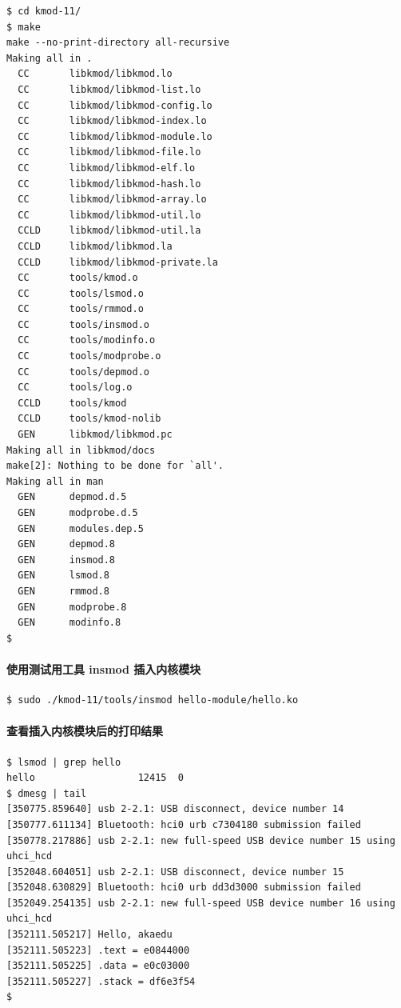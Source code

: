 \documentclass[11pt,a4paper]{article}
\begin{document}
{\begin{shaded}\begin{verbatim}
$ cd kmod-11/ 
$ make
make --no-print-directory all-recursive
Making all in .
  CC       libkmod/libkmod.lo
  CC       libkmod/libkmod-list.lo
  CC       libkmod/libkmod-config.lo
  CC       libkmod/libkmod-index.lo
  CC       libkmod/libkmod-module.lo
  CC       libkmod/libkmod-file.lo
  CC       libkmod/libkmod-elf.lo
  CC       libkmod/libkmod-hash.lo
  CC       libkmod/libkmod-array.lo
  CC       libkmod/libkmod-util.lo
  CCLD     libkmod/libkmod-util.la
  CCLD     libkmod/libkmod.la
  CCLD     libkmod/libkmod-private.la
  CC       tools/kmod.o
  CC       tools/lsmod.o
  CC       tools/rmmod.o
  CC       tools/insmod.o
  CC       tools/modinfo.o
  CC       tools/modprobe.o
  CC       tools/depmod.o
  CC       tools/log.o
  CCLD     tools/kmod
  CCLD     tools/kmod-nolib
  GEN      libkmod/libkmod.pc
Making all in libkmod/docs
make[2]: Nothing to be done for `all'.
Making all in man
  GEN      depmod.d.5
  GEN      modprobe.d.5
  GEN      modules.dep.5
  GEN      depmod.8
  GEN      insmod.8
  GEN      lsmod.8
  GEN      rmmod.8
  GEN      modprobe.8
  GEN      modinfo.8
$ 
\end{verbatim}\end{shaded}}
\paragraph{使用测试用工具 insmod 插入内核模块}

{\begin{shaded}\begin{verbatim}
$ sudo ./kmod-11/tools/insmod hello-module/hello.ko 
\end{verbatim}\end{shaded}}
\paragraph{查看插入内核模块后的打印结果}

{\begin{shaded}\begin{verbatim}
$ lsmod | grep hello
hello                  12415  0 
$ dmesg | tail
[350775.859640] usb 2-2.1: USB disconnect, device number 14
[350777.611134] Bluetooth: hci0 urb c7304180 submission failed
[350778.217886] usb 2-2.1: new full-speed USB device number 15 using uhci_hcd
[352048.604051] usb 2-2.1: USB disconnect, device number 15
[352048.630829] Bluetooth: hci0 urb dd3d3000 submission failed
[352049.254135] usb 2-2.1: new full-speed USB device number 16 using uhci_hcd
[352111.505217] Hello, akaedu
[352111.505223] .text = e0844000
[352111.505225] .data = e0c03000
[352111.505227] .stack = df6e3f54
$ 
\end{verbatim}\end{shaded}}
\end{document}
